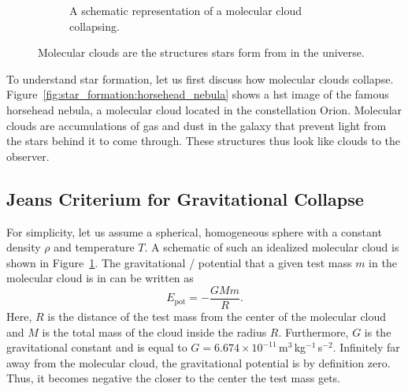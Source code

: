 \begin{figure}[tb]
\begin{subfigure}{0.459\textwidth}
        \caption{A schematic representation of a molecular cloud collapsing.}
        \label{fig:star_formation:cloud_collapse_schematic}
    \end{subfigure}
    \caption{Molecular clouds are the structures stars form from in the universe.}
    \label{fig:star_formation:molecular_clouds}
\end{figure}
To understand star formation, let us first discuss how molecular clouds collapse. Figure~\ref{fig:star_formation:horsehead_nebula} shows a \ac{hst} image of the famous horsehead nebula, a molecular cloud located in the constellation Orion. Molecular clouds are accumulations of gas and dust in the galaxy that prevent light from the stars behind it to come through. These structures thus look like clouds to the observer.

\subsection{Jeans Criterium for Gravitational Collapse}

For simplicity, let us assume a spherical, homogeneous sphere with a constant density $\rho$ and temperature $T$. A schematic of such an idealized molecular cloud is shown in Figure~\ref{fig:star_formation:cloud_collapse_schematic}. The gravitational / potential that a given test mass $m$ in the molecular cloud is in can be written as
\begin{equation}
    E_\mathrm{pot} = -\frac{GMm}{R}.\label{eqn:star_formation:potential_energy}
\end{equation}
Here, $R$ is the distance of the test mass from the center of the molecular cloud and $M$ is the total mass of the cloud inside the radius $R$. Furthermore, $G$ is the gravitational constant and is equal to $G=6.674 \times 10^{-11}$\,m$^{3}$\,kg$^{-1}$\,s$^{-2}$. Infinitely far away from the molecular cloud, the gravitational potential is by definition zero. Thus, it becomes negative the closer to the center the test mass gets. 

